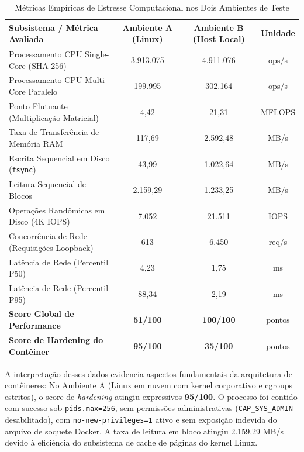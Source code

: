 \begin{table}[htb]
    \centering
    \ABNTEXfontereduzida
    \begin{minipage}{\textwidth}
        \caption{Métricas Empíricas de Estresse Computacional nos Dois Ambientes de Teste}
        \label{tab:benchmark-comparativo}
        \setlength{\tabcolsep}{4pt}
        \begin{tabular}{p{6.4cm}ccc}
            \toprule
            \textbf{Subsistema / Métrica Avaliada} & \textbf{Ambiente A (Linux)} & \textbf{Ambiente B (Host Local)} & \textbf{Unidade} \\
            \midrule
            Processamento CPU Single-Core (SHA-256) & 3.913.075 & 4.911.076 & ops/s \\
            Processamento CPU Multi-Core Paralelo & 199.995 & 302.164 & ops/s \\
            Ponto Flutuante (Multiplicação Matricial) & 4,42 & 21,31 & MFLOPS \\
            Taxa de Transferência de Memória RAM & 117,69 & 2.592,48 & MB/s \\
            Escrita Sequencial em Disco (\texttt{fsync}) & 43,99 & 1.022,64 & MB/s \\
            Leitura Sequencial de Blocos & 2.159,29 & 1.233,25 & MB/s \\
            Operações Randômicas em Disco (4K IOPS) & 7.052 & 21.511 & IOPS \\
            Concorrência de Rede (Requisições Loopback) & 613 & 6.450 & req/s \\
            Latência de Rede (Percentil P50) & 4,23 & 1,75 & ms \\
            Latência de Rede (Percentil P95) & 88,34 & 2,19 & ms \\
            \midrule
            \textbf{Score Global de Performance} & \textbf{51/100} & \textbf{100/100} & pontos \\
            \textbf{Score de Hardening do Contêiner} & \textbf{95/100} & \textbf{35/100} & pontos \\
            \bottomrule
        \end{tabular}
    \end{minipage}
\end{table}

A interpretação desses dados evidencia aspectos fundamentais da arquitetura de contêineres:
No Ambiente A (Linux em nuvem com kernel corporativo e cgroups estritos), o score de \textit{hardening} atingiu expressivos \textbf{95/100}. O processo foi contido com sucesso sob \texttt{pids.max=256}, sem permissões administrativas (\texttt{CAP\_SYS\_ADMIN} desabilitado), com \texttt{no-new-privileges=1} ativo e sem exposição indevida do arquivo de soquete Docker. A taxa de leitura em bloco atingiu 2.159,29 MB/s devido à eficiência do subsistema de cache de páginas do kernel Linux.

